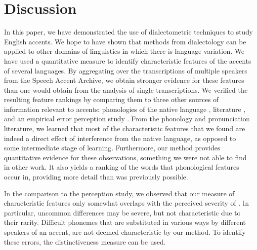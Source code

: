 \documentclass[output=paper]{LSP/langsci}
\begin{document}

\section{Discussion}
In this paper, we have demonstrated the use of dialectometric techniques to study English accents. We hope to have shown that methods from dialectology can be applied to other domains of linguistics in which there is language variation. We have used a quantitative measure to identify characteristic features of the accents of several languages. By aggregating over the transcriptions of multiple speakers from the Speech Accent Archive, we obtain stronger evidence for these features than one would obtain from the analysis of single transcriptions. We verified the resulting feature rankings by comparing them to three other sources of information relevant to accents: phonologies of the native language \citep{walker_french_2001},  literature \citep{nadasdy_background_2006}, and an empirical error perception study \citep{van_den_doel_evaluation_2006}. From the phonology and pronunciation literature, we learned that most of the characteristic features that we found are indeed a direct effect of interference from the native language, as opposed to some intermediate stage of learning. Furthermore, our method provides quantitative evidence for these observations, something we were not able to find in other work. It also yields a ranking of the words that phonological features occur in, providing more detail than was previously possible.

In the comparison to the perception study, we observed that our measure of characteristic features only somewhat overlaps with the perceived severity of . In particular, uncommon differences may be severe, but not characteristic due to their rarity. Difficult phonemes that are substituted in various ways by different speakers of an accent, are not deemed characteristic by our method. To identify these errors, the distinctiveness measure can be used.
\end{document}
